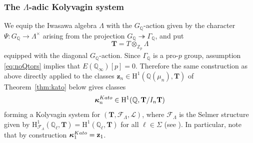 \documentclass[10pt,reqno]{amsart}
\makeatletter
\numberwithin{equation}{section}
\theoremstyle{plain}
\theoremstyle{definition}
\theoremstyle{definition}
\theoremstyle{plain}
\theoremstyle{plain}
\theoremstyle{plain}
\theoremstyle{plain}
\theoremstyle{plain}
\theoremstyle{plain}
\renewcommand{\varprojlim}{%
  \mathop{\mathpalette\varlim@{\leftarrowfill@\scriptscriptstyle}}\nmlimits@
}
\newcommand{\limm}{\varprojlim}
\newcommand{\Z}{\mathbb{Z}}
\newcommand{\Q}{\mathbb{Q}}
\newcommand{\bkappa}{\boldsymbol{\kappa}}
\DeclareMathOperator{\gal}{Gal}
\newcommand{\Fcal}{\mathcal{F}}
\newcommand{\cN}{\mathcal{N}}
\newcommand{\rH}{\mathrm{H}}
\makeatother
\begin{document}
\subsubsection{The $\Lambda$-adic Kolyvagin system}
We equip the Iwasawa algebra $\Lambda$ with the $G_\Q$-action given by the character $\Psi:G_\Q\rightarrow\Lambda^\times$ arising from the projection $G_\Q\twoheadrightarrow\Gamma_\Q$, and put 
\[
\mathbf{T}=T\otimes_{\Z_p}\Lambda
\]
equipped with the diagonal $G_\Q$-action. 
%
%
%
Since $\Gamma_{\Q}$ is a pro-$p$ group,  assumption \eqref{eq:noQtors} implies that $E(\Q_\infty)[p]=0$. Therefore the same construction as above directly applied to the classes $\mathbf{z}_n\in\rH^1(\Q(\mu_n),\mathbf{T})$ of Theorem~\ref{thm:kato} below gives classes
\[
\bkappa_{n}^{\rm Kato}\in \rH^1(\Q,\mathbf{T}/I_n\mathbf{T})
\] 
forming a Kolyvagin system for $(\mathbf{T},\Fcal_\Lambda,\mathcal{L})$, where $\Fcal_\Lambda$ is the Selmer structure given by $\rH^1_{\Fcal_\Lambda}(\Q_\ell,\mathbf{T})=\rH^1(\Q_\ell,\mathbf{T})$ for all $\ell\in\Sigma$ (see \cite[$\S\S{5.3}, 6.2$]{mazrub}). In particular, note that by construction $\bkappa_1^{\rm Kato}=\mathbf{z}_1$.
\end{document}
